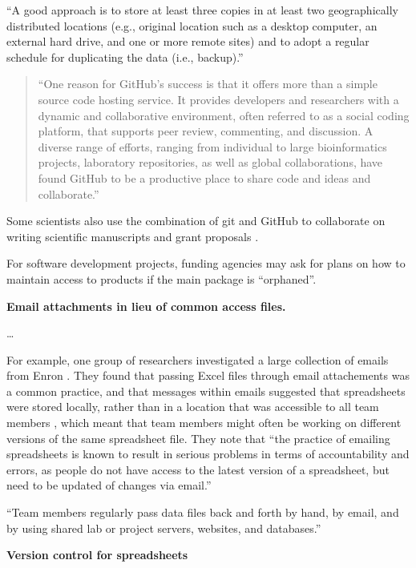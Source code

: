 \documentclass[]{tufte-book}
\begin{document}
``A good approach is to store at least three copies in at least two
geographically distributed locations (e.g., original location such as a desktop
computer, an external hard drive, and one or more remote sites) and to adopt a
regular schedule for duplicating the data (i.e., backup).'' \citep{michener2015ten}

\begin{quote}
``One reason for GitHub's success is that it offers more than a simple source
code hosting service. It provides developers and researchers with a dynamic
and collaborative environment, often referred to as a social coding platform,
that supports peer review, commenting, and discussion. A diverse range of efforts,
ranging from individual to large bioinformatics projects, laboratory repositories,
as well as global collaborations, have found GitHub to be a productive place
to share code and ideas and collaborate.'' \citep{perez2016ten}
\end{quote}

Some scientists also use the combination of git and GitHub to collaborate
on writing scientific
manuscripts and grant proposals \citep{perez2016ten}.

For software development projects, funding agencies may ask for plans on how to maintain
access to products if the main package is ``orphaned''.

\textbf{Email attachments in lieu of common access files.}

\ldots{}

For example, one group of researchers investigated a large collection of emails
from Enron \citep{hermans2015enron}. They found that passing Excel files through
email attachements was a common practice, and that messages within emails
suggested that spreadsheets were stored locally, rather than in a location that
was accessible to all team members \citep{hermans2015enron}, which meant that team
members might often be working on different versions of the same spreadsheet
file. They note that ``the practice of emailing spreadsheets is known to result in
serious problems in terms of accountability and errors, as people do not have
access to the latest version of a spreadsheet, but need to be updated of changes
via email.'' \citep{hermans2015enron}

``Team members regularly pass data files back and forth by hand, by email, and by
using shared lab or project servers, websites, and databases.''
\citep{edwards2011science}

\textbf{Version control for spreadsheets}
\end{document}

